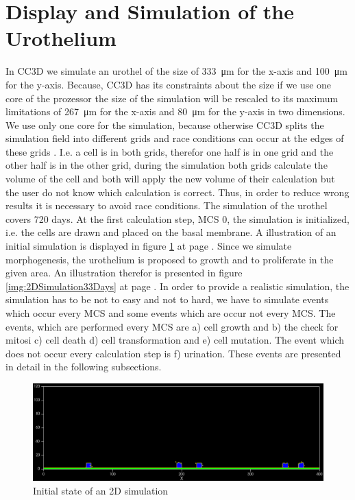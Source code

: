 \section{Display and Simulation of the Urothelium}
In \ac{CC3D} we simulate an urothel of the size of \SI{333}{\micro\metre} for the x-axis and \SI{100}{\micro\metre} for the y-axis. Because, \ac{CC3D} has its constraints about the size if we use one core of the prozessor the size of the simulation will be rescaled to its maximum limitations of \SI{267}{\micro\metre} for the x-axis and \SI{80}{\micro\metre} for the y-axis in two dimensions. We use only one core for the simulation, because otherwise \ac{CC3D} splits the simulation field into different grids and race conditions can occur at the edges of these grids \cite{MaciejH.Swat2017}. I.e. a cell is in both grids, therefor one half is in one grid and the other half is in the other grid, during the simulation both grids calculate the volume of the cell and both will apply the new volume of their calculation but the user do not know which calculation is correct. Thus, in order to reduce wrong results it is necessary to avoid race conditions. \newline 
The simulation of the urothel covers 720 days. At the first calculation step, \ac{MCS} 0, the simulation is initialized, i.e. the cells are drawn and placed on the basal membrane. A illustration of an initial simulation is displayed in figure \ref{img:2DSimulationInitialState} at page \pageref{img:2DSimulationInitialState}. Since we simulate morphogenesis, the urothelium is proposed to growth and to proliferate in the given area. An illustration therefor is presented in figure \ref{img:2DSimulation33Days} at page \pageref{img:2DSimulation33Days}. \newline
In order to provide a realistic simulation, the simulation has to be not to easy and not to hard, we have to simulate events which occur every \ac{MCS} and some events which are occur not every \ac{MCS}. The events, which are performed every \ac{MCS} are a) cell growth and b) the check for mitosi c) cell death d) cell transformation and e) cell mutation. The event which does not occur every calculation step is f) urination. These events are presented in detail in the following subsections.

\begin{figure}
	\center
	\includegraphics[scale=0.35]{figures/2DSimulation-InitialState.png}
	\caption{Initial state of an 2D simulation}
	\label{img:2DSimulationInitialState}
\end{figure}


